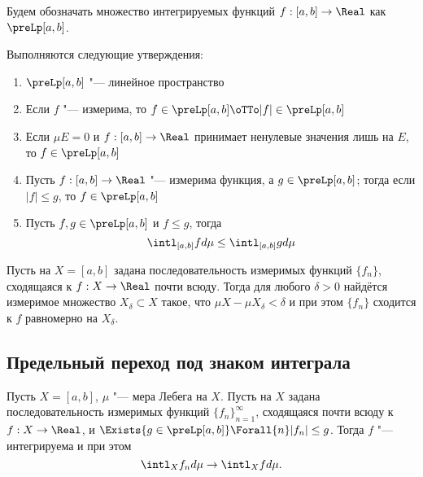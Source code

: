 \documentclass[main]{subfiles}
\begin{document}
Будем обозначать множество интегрируемых
функций \( f : [a, b] \to \Real \)
как \( \preLp[a, b] \).

\begin{theorem*}
  Выполняются следующие утверждения:
  \begin{enumerate}
    \item \( \preLp[a, b] \) "--- линейное пространство
    \item Если \( f \) "--- измерима, то
      \( f \in \preLp[a, b] \oTTo |f| \in \preLp[a, b] \)
    \item Если \( \mu E = 0 \) и \( f : [a, b] \to \Real \)
      принимает ненулевые значения лишь на \( E \),
      то \( f \in \preLp[a, b] \)
    \item Пусть \( f : [a, b] \to \Real \) "--- измерима
      функция, а \( g \in \preLp[a, b] \); тогда
      если \( |f| \le g \), то
      \( f \in \preLp[a, b] \)
    \item Пусть \( f, g \in \preLp[a, b] \)
      и \( f \le g \), тогда
      \[
	\intl_{[a,b]} f d\mu \le \intl_{[a,b]} g d\mu
      \]
  \end{enumerate}
\end{theorem*}

\begin{theorem*}[Егорова]
  Пусть на \( X = [a, b] \) задана
  последовательность измеримых функций
  \( \{ f_n \} \), сходящаяся к
  \( f : X \to \Real \) почти всюду.
  Тогда для любого \( \delta > 0 \)
  найдётся измеримое множество \( X_\delta \subset X \)
  такое, что \( \mu X - \mu X_\delta < \delta \)
  и при этом \( \{ f_n \} \) сходится
  к \( f \) равномерно на \( X_\delta \).
\end{theorem*}

\subsection{Предельный переход под знаком интеграла}

\begin{theorem*}
  Пусть \( X = [a, b] \), \( \mu \) "--- мера Лебега на \( X \).
  Пусть на \( X \) задана последовательность
  измеримых функций \( \{ f_n \}_{n=1}^\infty \),
  сходящаяся почти всюду к \( f : X \to \Real \),
  и \( \Exists{g \in \preLp[a, b]} \Forall{n} |f_n| \le g \).
  Тогда \( f \) "--- интегрируема и при этом
  \[
    \intl_X f_n d \mu \to
    \intl_X f d \mu.
  \]
\end{theorem*}
\end{document}
